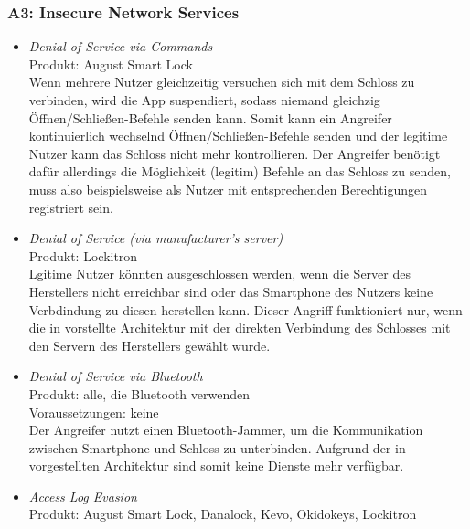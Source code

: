     \subsubsection*{A3: Insecure Network Services}
        \begin{itemize}[leftmargin=0cm,label={}]
            \item \emph{Denial of Service via Commands}\cite{Ye2017}\label{vuln:doscmd}\\
    	        Produkt: August Smart Lock \\ 
                Wenn mehrere Nutzer gleichzeitig versuchen sich mit dem Schloss zu verbinden, wird die App suspendiert, sodass niemand gleichzig Öffnen/\-Schließen-Befehle senden kann. 
    		    Somit kann ein Angreifer kontinuierlich wechselnd Öffnen/Schließen-Befehle senden und der legitime Nutzer kann das Schloss nicht mehr kontrollieren. 
    		    Der Angreifer benötigt dafür allerdings die Möglichkeit (legitim) Befehle an das Schloss zu senden, muss also beispielsweise als Nutzer mit entsprechenden Berechtigungen registriert sein.
		    \item \emph{Denial of Service (via manufacturer's server)}\cite{Ye2017}\label{vuln:dosserver}\\
                Produkt: Lockitron\\
                Lgitime Nutzer könnten ausgeschlossen werden, wenn die Server des Herstellers nicht erreichbar sind oder das Smartphone des Nutzers keine Verbdindung zu diesen herstellen kann.
                Dieser Angriff funktioniert nur, wenn die in  vorstellte Architektur mit der direkten Verbindung des Schlosses mit den Servern des Herstellers gewählt wurde.
            \item \emph{Denial of Service via Bluetooth}\cite{Ye2017}\label{vuln:dosble}\\
    	        Produkt: alle, die Bluetooth verwenden\\ 
                Voraussetzungen: keine\\
                Der Angreifer nutzt einen Bluetooth-Jammer, um die Kommunikation zwischen Smartphone und Schloss zu unterbinden. 
                Aufgrund der in  vorgestellten Architektur sind somit keine Dienste mehr verfügbar. 
            \item \emph{Access Log Evasion}\cite{Ho2016}\label{vuln:accesslogevasion}\\
                Produkt: August Smart Lock, Danalock, Kevo, Okidokeys, Lockitron\\

\end{itemize}
